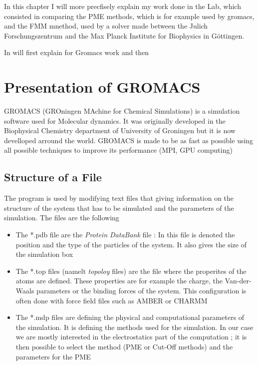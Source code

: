 \documentclass[10pt,twoside,a4paper]{report}
\begin{document}
    In this chapter I will more precfisely explain my work done in the Lab, which consisted in comparing the PME methods, which is for example used by gromacs, and the FMM mnethod, used by a solver made between the Julich Forschungszentrum and the Max Planck Institute for Biophysics in Göttingen.

    In will first explain for Gromacs work and then 


\section{Presentation of GROMACS}

    GROMACS (GROningen MAchine for Chemical Simulations) is a simulation software used for Molecular dynamics. It was originally developed in the Biophysical Chemistry department of University of Groningen but it is now develloped arround the world. GROMACS is made to be as fast as possible using all possible techniques to improve its performance (MPI, GPU computing) 
    
   
	\subsection{Structure of a File}
	
	 The program is used  by modifying text files that giving information on the structure of the system that has to be simulated and the parameters of the simulation. The files are the following 
	 
	\begin{itemize}
	
	\item The *.pdb file are the \textit{Protein DataBank} file : In this file is denoted the position and the type of the particles of the system. It also gives the size of the simulation box

	\item The *.top files (namelt \textit{topoloy} files) are the file where the properites of the atoms are defined. These properties are for example the charge, the Van-der-Waals parameters or the binding forces of the system. This configuration is often done with force field files such as AMBER or CHARMM
		 
	\item The *.mdp files are defining the physical and computational parameters of the simulation. It is defining the methods used for the simulation. In our case we are mostly interested in the electrostatics part of the computation ; it is then possible to select the method (PME or Cut-Off methods) and the parameters for the PME
	
	\end{itemize}
		
\end{document}
